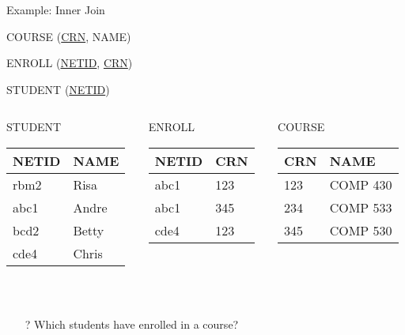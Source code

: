 \documentclass[aspectratio=169]{beamer}
\begin{document}
\begin{frame}{Example: Inner Join}

COURSE (\underline{CRN}, NAME)

ENROLL (\underline{NETID}, \underline{CRN})

STUDENT (\underline{NETID})

\begin{columns}[T]
\begin{column}{0.3\textwidth}
STUDENT\\
\begin{tabular}{|l|l|} \hline
\textbf{NETID} & \textbf{NAME} \\ \hline
rbm2 & Risa \\\hline
abc1 & Andre \\\hline
bcd2 & Betty \\ \hline
cde4 & Chris \\ \hline
\end{tabular}\\
\end{column}
\begin{column}{0.3\textwidth}
ENROLL\\
\begin{tabular}{|l|l|} \hline
\textbf{NETID} & \textbf{CRN} \\ \hline
abc1 & 123 \\\hline
abc1 & 345\\\hline
cde4 & 123 \\ \hline
\end{tabular}
\end{column}
\begin{column}{0.3\textwidth}
COURSE\\
\begin{tabular}{|l|l|} \hline
\textbf{CRN} & \textbf{NAME} \\ \hline
123 & COMP 430 \\\hline
234 & COMP 533 \\\hline
345 & COMP 530 \\ \hline
\end{tabular}\\
\end{column}
\end{columns}


\begin{itemize}
\item[?] Which students have enrolled in a course?
\end{itemize}

\end{frame}
\end{document}
